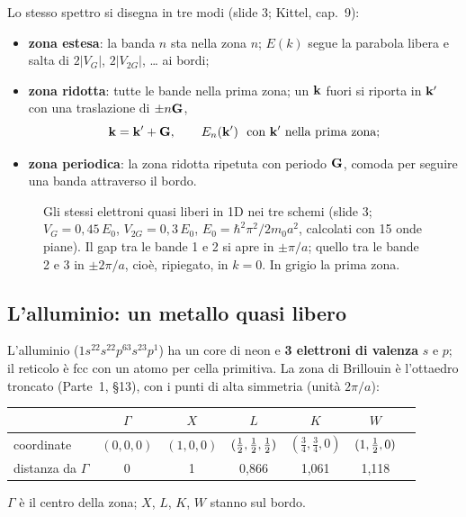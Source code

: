 \documentclass[11pt,a4paper]{article}
\begin{document}
\begin{definizione}
Lo stesso spettro si disegna in tre modi (slide 3; Kittel, cap.~9):
\begin{itemize}[leftmargin=*]
\item \textbf{zona estesa}: la banda $n$ sta nella zona $n$; $E(k)$ segue la parabola libera e salta di $2|V_G|$, $2|V_{2G}|$, \ldots{} ai bordi;
\item \textbf{zona ridotta}: tutte le bande nella prima zona; un $\mathbf k$ fuori si riporta in $\mathbf k'$ con una traslazione di $\pm n\mathbf G$,
\[
\mathbf k=\mathbf k'+\mathbf G,\qquad E_{n}(\mathbf k')\ \ \text{con }\mathbf k'\ \text{nella prima zona};
\]
\item \textbf{zona periodica}: la zona ridotta ripetuta con periodo $\mathbf G$, comoda per seguire una banda attraverso il bordo.
\end{itemize}
\end{definizione}

\begin{figure}[tbp]
\centering
{}
\caption{Gli stessi elettroni quasi liberi in 1D nei tre schemi (slide 3; $V_G=0{,}45\,E_0$, $V_{2G}=0{,}3\,E_0$, $E_0=\hbar^2\pi^2/2m_0a^2$,
calcolati con 15 onde piane). Il gap tra le bande 1 e 2 si apre in $\pm\pi/a$; quello tra le bande 2 e 3 in $\pm2\pi/a$, cioè, ripiegato, in
$k=0$. In grigio la prima zona.}\label{fig:schemi}
\end{figure}

\subsection{L'alluminio: un metallo quasi libero}\label{sec:al}
L'alluminio ($1s^22s^22p^63s^23p^1$) ha un core di neon e \textbf{3 elettroni di valenza} $s$ e $p$; il reticolo è fcc con un atomo per cella
primitiva. La zona di Brillouin è l'ottaedro troncato (Parte~1, §13), con i punti di alta simmetria (unità $2\pi/a$):
\begin{center}\small
\begin{tabular}{@{}lcccccc@{}}
\toprule
& $\Gamma$ & $X$ & $L$ & $K$ & $W$\\
\midrule
coordinate & $(0,0,0)$ & $(1,0,0)$ & $(\tfrac12,\tfrac12,\tfrac12)$ & $(\frac34,\frac34,0)$ & $(1,\tfrac12,0)$\\
distanza da $\Gamma$ & 0 & 1 & 0,866 & 1,061 & 1,118\\
\bottomrule
\end{tabular}
\end{center}
$\Gamma$ è il centro della zona; $X$, $L$, $K$, $W$ stanno sul bordo.
\end{document}
